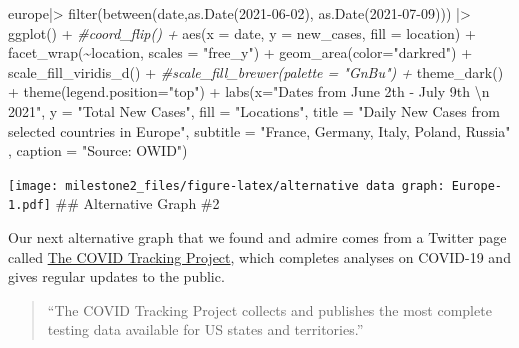\documentclass[
]{article}
\newenvironment{Shaded}{\begin{snugshade}}{\end{snugshade}}
\newcommand{\AttributeTok}[1]{\textcolor[rgb]{0.77,0.63,0.00}{#1}}
\newcommand{\CommentTok}[1]{\textcolor[rgb]{0.56,0.35,0.01}{\textit{#1}}}
\newcommand{\FunctionTok}[1]{\textcolor[rgb]{0.00,0.00,0.00}{#1}}
\newcommand{\NormalTok}[1]{#1}
\newcommand{\SpecialCharTok}[1]{\textcolor[rgb]{0.00,0.00,0.00}{#1}}
\newcommand{\StringTok}[1]{\textcolor[rgb]{0.31,0.60,0.02}{#1}}
\begin{document}
\begin{Shaded}
\begin{Highlighting}[]
\NormalTok{europe}\SpecialCharTok{|\textgreater{}}
  \FunctionTok{filter}\NormalTok{(}\FunctionTok{between}\NormalTok{(date,}\FunctionTok{as.Date}\NormalTok{(}\StringTok{\textquotesingle{}2021{-}06{-}02\textquotesingle{}}\NormalTok{), }\FunctionTok{as.Date}\NormalTok{(}\StringTok{\textquotesingle{}2021{-}07{-}09\textquotesingle{}}\NormalTok{))) }\SpecialCharTok{|\textgreater{}}
  \FunctionTok{ggplot}\NormalTok{() }\SpecialCharTok{+}
  \CommentTok{\#coord\_flip() +}
  \FunctionTok{aes}\NormalTok{(}\AttributeTok{x =}\NormalTok{ date, }\AttributeTok{y =}\NormalTok{ new\_cases, }\AttributeTok{fill =}\NormalTok{ location) }\SpecialCharTok{+}
  \FunctionTok{facet\_wrap}\NormalTok{(}\SpecialCharTok{\textasciitilde{}}\NormalTok{location, }\AttributeTok{scales =} \StringTok{"free\_y"}\NormalTok{) }\SpecialCharTok{+}
  \FunctionTok{geom\_area}\NormalTok{(}\AttributeTok{color=}\StringTok{"darkred"}\NormalTok{) }\SpecialCharTok{+}
  \FunctionTok{scale\_fill\_viridis\_d}\NormalTok{() }\SpecialCharTok{+}
  \CommentTok{\#scale\_fill\_brewer(palette = "GnBu") +}
  \FunctionTok{theme\_dark}\NormalTok{() }\SpecialCharTok{+}
  \FunctionTok{theme}\NormalTok{(}\AttributeTok{legend.position=}\StringTok{"top"}\NormalTok{) }\SpecialCharTok{+}
   \FunctionTok{labs}\NormalTok{(}\AttributeTok{x=}\StringTok{"Dates from June 2th {-} July 9th }\SpecialCharTok{\textbackslash{}n}\StringTok{ 2021"}\NormalTok{,}
       \AttributeTok{y =} \StringTok{"Total New Cases"}\NormalTok{,}
       \AttributeTok{fill =} \StringTok{"Locations"}\NormalTok{,}
       \AttributeTok{title =} \StringTok{"Daily New Cases from selected countries in Europe"}\NormalTok{,}
       \AttributeTok{subtitle =} \StringTok{"France, Germany, Italy, Poland, Russia"}\NormalTok{ ,}
       \AttributeTok{caption =} \StringTok{"Source: OWID"}\NormalTok{)}
\end{Highlighting}
\end{Shaded}

\texttt{[image: milestone2\_files/figure-latex/alternative data graph: Europe-1.pdf]}
\#\# Alternative Graph \#2

Our next alternative graph that we found and admire comes from a Twitter
page called \href{https://mobile.twitter.com/covid19tracking}{The COVID
Tracking Project}, which completes analyses on COVID-19 and gives
regular updates to the public.

\begin{quote}
``The COVID Tracking Project collects and publishes the most complete
testing data available for US states and territories.''
\end{quote}
\end{document}
